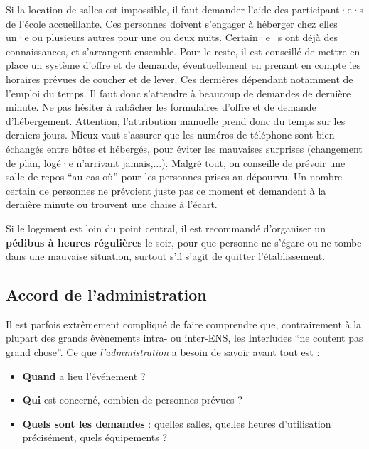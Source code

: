 Si la location de salles est impossible, il faut demander l'aide des participant·e·s de l'école accueillante. Ces personnes doivent s'engager à héberger chez elles un·e ou plusieurs autres pour une ou deux nuits. Certain·e·s ont déjà des connaissances, et s'arrangent ensemble. Pour le reste, il est conseillé de mettre en place un système d'offre et de demande, éventuellement en prenant en compte les horaires prévues de coucher et de lever. Ces dernières dépendant notamment de l'emploi du temps. Il faut donc s'attendre à beaucoup de demandes de dernière minute. Ne pas hésiter à rabâcher les formulaires d'offre et de demande d'hébergement. Attention, l'attribution manuelle prend donc du temps sur les derniers jours. Mieux vaut s'assurer que les numéros de téléphone sont bien échangés entre hôtes et hébergés, pour éviter les mauvaises surprises (changement de plan, logé·e n'arrivant jamais,...). Malgré tout, on conseille de prévoir une salle de repos ``au cas où'' pour les personnes prises au dépourvu. Un nombre certain de personnes ne prévoient juste pas ce moment et demandent à la dernière minute ou trouvent une chaise à l'écart.

Si le logement est loin du point central, il est recommandé d'organiser un \textbf{pédibus à heures régulières} le soir, pour que personne ne s'égare ou ne tombe dans une mauvaise situation, surtout s'il s'agit de quitter l'établissement.


\subsection{Accord de l'administration}\label{sec:administration}

Il est parfois extrêmement compliqué de faire comprendre que, contrairement à la plupart des grands évènements intra- ou inter-ENS, les Interludes ``ne coutent pas grand chose''. Ce que \emph{l'administration} a besoin de savoir avant tout est :
\begin{itemize}
    \item \textbf{Quand} a lieu l'événement ?
    \item \textbf{Qui} est concerné, combien de personnes prévues ?
    \item \textbf{Quels sont les demandes} : quelles salles, quelles heures d'utilisation précisément, quels équipements ?
\end{itemize}

